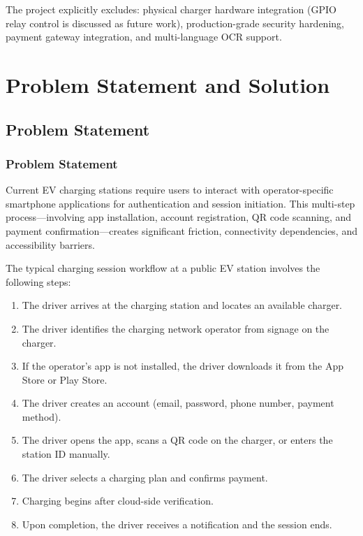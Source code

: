 \documentclass[11pt]{report}
\begin{document}
The project explicitly excludes: physical charger hardware integration (GPIO relay control is discussed as future work), production-grade security hardening, payment gateway integration, and multi-language OCR support.

\chapter{Problem Statement and Solution}
\section{Problem Statement}
\subsection{\label{ps}Problem Statement}

Current EV charging stations require users to interact with operator-specific smartphone applications for authentication and session initiation. This multi-step process---involving app installation, account registration, QR code scanning, and payment confirmation---creates significant friction, connectivity dependencies, and accessibility barriers.

The typical charging session workflow at a public EV station involves the following steps:
\begin{enumerate}
    \item The driver arrives at the charging station and locates an available charger.
    \item The driver identifies the charging network operator from signage on the charger.
    \item If the operator's app is not installed, the driver downloads it from the App Store or Play Store.
    \item The driver creates an account (email, password, phone number, payment method).
    \item The driver opens the app, scans a QR code on the charger, or enters the station ID manually.
    \item The driver selects a charging plan and confirms payment.
    \item Charging begins after cloud-side verification.
    \item Upon completion, the driver receives a notification and the session ends.
\end{enumerate}
\end{document}
